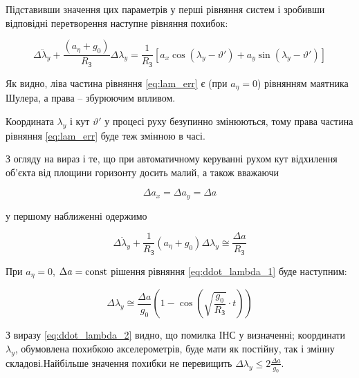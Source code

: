 Підставивши значення цих параметрів у перші рівняння систем і зробивши відповідні перетворення наступне рівняння похибок:

\begin{equation} 
\label{eq:lam_err} 
\Delta \ddot{\lambda }_{y} +\frac{(a_{\eta } +g_{0} )}{R_{{\text{З}}} } 
\Delta \lambda _{y} =\frac{1}{R_{{\text{З}}} } \left[a_{x} \cos (\lambda _{y} -\vartheta ')+a_{y} \sin (\lambda _{y} -
\vartheta ')\right] 
\end{equation} 

Як видно, ліва частина рівняння \eqref{eq:lam_err} є (при $a_{\eta } =0$) рівнянням маятника Шулера, а права -- збурюючим впливом.

Координата $\lambda _{y} $ і кут $\vartheta '$ у процесі руху безупинно змінюються, тому права частина рівняння \eqref{eq:lam_err} 
буде теж змінною в часі.

З огляду на вираз і те, що при автоматичному керуванні рухом кут відхилення об'єкта від площини горизонту досить малий, а також вважаючи

\[\Delta a_{x} =\Delta a_{y} =\Delta a\] 

у першому наближенні одержимо

\begin{equation} 
\label{eq:ddot_lambda_1} 
\Delta \ddot{\lambda }_{y} +\frac{1}{R_{{\text{З}}} } (a_{\eta } +g_{0} )\Delta \lambda _{y} \cong \frac{\Delta a}{R_{{\text{З}}} }  
\end{equation} 

При $a_{\eta } =0$, $\Delta a={\rm const}$ рішення рівняння \eqref{eq:ddot_lambda_1} буде наступним:

\begin{equation} 
\label{eq:ddot_lambda_2} 
\Delta \lambda _{y} \cong \frac{\Delta a}{g_{0} } \left(1-\cos \left(\sqrt{\frac{g_{0} }{R_{{\text{З}}} } } \cdot t\right)\right) 
\end{equation} 

З виразу \eqref{eq:ddot_lambda_2} видно, що помилка ІНС у визначенні; координати $\lambda _{y} $, обумовлена похибкою акселерометрів, 
буде мати як постійну, так і змінну складові.Найбільше значення похибки не перевищить  $\Delta \lambda _{y} \le 2\frac{\Delta a}{g_{0} } $. 




